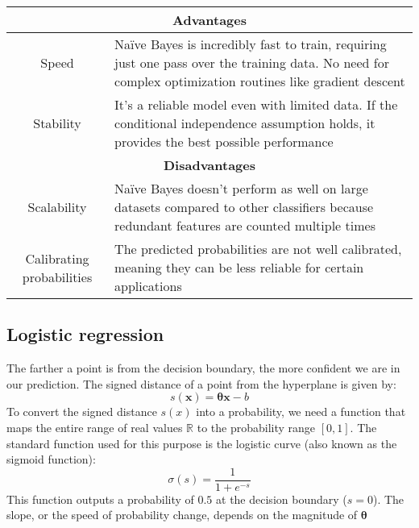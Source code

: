 \renewcommand*{\arraystretch}{1.5}
\begin{table}[!ht]
    \centering
    \begin{tabular}{|c|p{10cm}|}
    \hline
    \multicolumn{2}{|c|}{\textbf{Advantages}} \\ \hline
    Speed                       & Naïve Bayes is incredibly fast to train, requiring just one pass over the training data. No need for complex optimization routines like gradient descent   \\ \hline
    Stability                   & It's a reliable model even with limited data. If the conditional independence assumption holds, it provides the best possible performance  \\ \hline
    \multicolumn{2}{|c|}{\textbf{Disadvantages}} \\ \hline
    Scalability                 & Naïve Bayes doesn't perform as well on large datasets compared to other classifiers because redundant features are counted multiple times \\ \hline
    Calibrating probabilities   & The predicted probabilities are not well calibrated, meaning they can be less reliable for certain applications \\ \hline
    \end{tabular}
\end{table}
\renewcommand*{\arraystretch}{1}

\subsection{Logistic regression}
The farther a point is from the decision boundary, the more confident we are in our prediction.
The signed distance of a point from the hyperplane is given by:
\[s(\textbf{x}) = \boldsymbol{\theta}\textbf{x}-b\]
\noindent To convert the signed distance $s(x)$ into a probability, we need a function that maps the entire range of real values $\mathbb{R}$ to the probability range $[0,1]$. 
The standard function used for this purpose is the logistic curve (also known as the sigmoid function):
\[\sigma(s)=\dfrac{1}{1+e^{-s}}\]
This function outputs a probability of $0.5$ at the decision boundary ($s=0$).
The slope, or the speed of probability change, depends on the magnitude of $\boldsymbol{\theta}$

